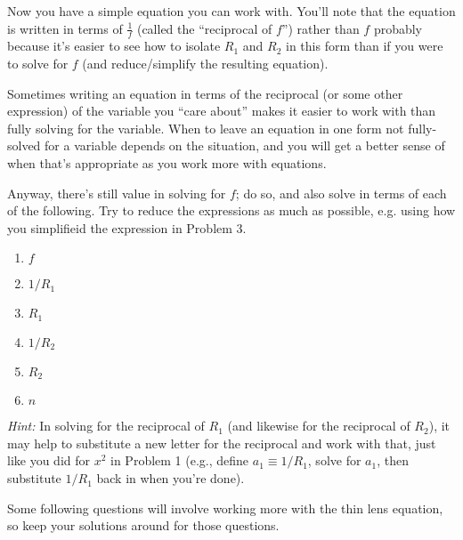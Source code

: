 \documentclass[10pt,letterpaper,twoside]{article}
\begin{document}
\begin{enumerate}
        Now you have a simple equation you can work with. You'll note that the
        equation is written in terms of $\frac{1}{f}$ (called the ``reciprocal of $f$'')
        rather than $f$ probably because it's easier to see how to isolate $R_1$ and
        $R_2$ in this form than if you were to solve for $f$ (and reduce/simplify the
        resulting equation).

        Sometimes writing an equation in terms of the reciprocal (or some other
        expression) of the variable you ``care about'' makes it easier to work with than
        fully solving for the variable. When to leave an equation in one form not
        fully-solved for a variable depends on the situation, and you will get a better
        sense of when that's appropriate as you work more with equations.

        Anyway, there's still value in solving for $f$; do so, and also solve in terms
        of each of the following. Try to reduce the expressions as much as possible,
        e.g. using how you simplifieid the expression in Problem 3.
        
        \begin{enumerate}
          \item $f$
          \item $1/R_1$
          \item $R_1$
          \item $1/R_2$
          \item $R_2$
          \item $n$
        \end{enumerate}

        {\it Hint:} In solving for the reciprocal of $R_1$ (and likewise for the
        reciprocal of $R_2$), it may help to substitute a new letter for the reciprocal
        and work with that, just like you did for $x^2$ in Problem 1 (e.g., define $a_1
        \equiv 1/R_1$, solve for $a_1$, then substitute $1/R_1$ back in when you're
        done).

        Some following questions will involve working more with the thin lens equation, so
        keep your solutions around for those questions.

\end{enumerate}
\end{document}
